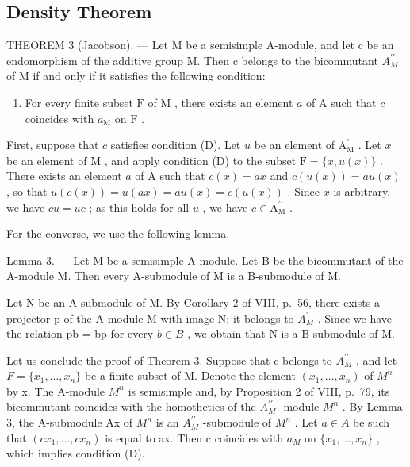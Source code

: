\subsection{Density Theorem}

THEOREM 3 (Jacobson). --- Let M be a semisimple A-module, and let c be an endomorphism of the additive group M. Then c belongs to the bicommutant \(A_{M}^{\prime\prime}\) of M if and only if it satisfies the following condition:

\begin{enumerate}
\def\labelenumi{(\Alph{enumi})}
\setcounter{enumi}{3}
\tightlist
\item
  For every finite subset \(\mathrm{F}\) of \(\mathrm{M}\) , there exists an element \(a\) of \(\mathrm{A}\) such that \(c\) coincides with \(a_{\mathrm{M}}\) on \(\mathrm{F}\) .
\end{enumerate}

First, suppose that \(c\) satisfies condition (D). Let \(u\) be an element of \(\mathrm{A}_{\mathrm{M}}^{\prime}\) . Let \(x\) be an element of \(\mathrm{M}\) , and apply condition (D) to the subset \(\mathrm{F} = \{x, u(x)\}\) . There exists an element \(a\) of \(\mathrm{A}\) such that \(c(x) = ax\) and \(c(u(x)) = au(x)\) , so that \(u(c(x)) = u(ax) = au(x) = c(u(x))\) . Since \(x\) is arbitrary, we have \(cu = uc\) ; as this holds for all \(u\) , we have \(c \in \mathrm{A}_{\mathrm{M}}^{\prime \prime}\) .

For the converse, we use the following lemma.

Lemma 3. --- Let M be a semisimple A-module. Let B be the bicommutant of the A-module M. Then every A-submodule of M is a B-submodule of M.

Let N be an A-submodule of M. By Corollary 2 of VIII, p.~56, there exists a projector p of the A-module M with image N; it belongs to \(A_{M}^{\prime}\) . Since we have the relation pb = bp for every \(b \in B\) , we obtain that N is a B-submodule of M.

Let us conclude the proof of Theorem 3. Suppose that c belongs to \(A_{M}^{\prime\prime}\) , and let \(F = \{x_{1}, \ldots, x_{n}\}\) be a finite subset of M. Denote the element \((x_{1}, \ldots, x_{n})\) of \(M^{n}\) by x. The A-module \(M^{n}\) is semisimple and, by Proposition 2 of VIII, p.~79, its bicommutant coincides with the homotheties of the \(A_{M}^{\prime\prime}\) -module \(M^{n}\) . By Lemma 3, the A-submodule Ax of \(M^{n}\) is an \(A_{M}^{\prime\prime}\) -submodule of \(M^{n}\) . Let \(a \in A\) be such that \((cx_{1}, \ldots, cx_{n})\) is equal to ax. Then c coincides with \(a_{M}\) on \(\{x_{1}, \ldots, x_{n}\}\) , which implies condition (D).

